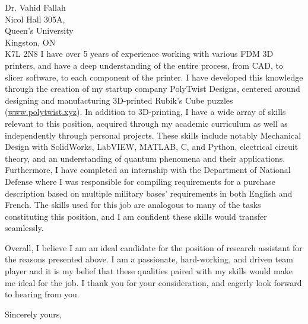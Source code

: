 \documentclass[11pt]{letter} %
\begin{document}
\begin{letter}{Dr. Vahid Fallah \\
Nicol Hall 305A, \\
Queen's University \\
Kingston, ON \\
K7L 2N8}
I have over 5 years of experience working with various FDM 3D printers, and have a deep understanding of the entire process, from CAD, to slicer software, to each component of the printer. I have developed this knowledge through the creation of my startup company PolyTwist Designs, centered around designing and manufacturing 3D-printed Rubik's Cube puzzles (\url{www.polytwist.xyz}). In addition to 3D-printing, I have a wide array of skills relevant to this position, acquired through my academic curriculum as well as independently through personal projects. These skills include notably Mechanical Design with SolidWorks, LabVIEW, MATLAB, C, and Python, electrical circuit theory, and an understanding of quantum phenomena and their applications. Furthermore, I have completed an internship with the Department of National Defense where I was responsible for compiling requirements for a purchase description based on multiple military bases' requirements in both English and French. The skills used for this job are analogous to many of the tasks constituting this position, and I am confident these skills would transfer seamlessly.

Overall, I believe I am an ideal candidate for the position of research assistant for the reasons presented above. I am a passionate, hard-working, and driven team player and it is my belief that these qualities paired with my skills would make me ideal for the job. I thank you for your consideration, and eagerly look forward to hearing from you.

\closing{Sincerely yours,}


\end{letter}
\end{document}
